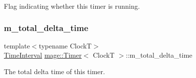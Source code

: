 Flag indicating whether this timer is running. \mbox{\label{classmage_1_1_timer_aa62b280ee2b58a3f75440cc4faf10b23}} 
\subsubsection{\texorpdfstring{m\+\_\+total\+\_\+delta\+\_\+time}{m\_total\_delta\_time}}
{\footnotesize\ttfamily template$<$typename ClockT$>$ \\
\mbox{\hyperlink{classmage_1_1_timer_a5c0fd78ceab0110637622bd0e9b8424d}{Time\+Interval}} \mbox{\hyperlink{classmage_1_1_timer}{mage\+::\+Timer}}$<$ ClockT $>$\+::m\+\_\+total\+\_\+delta\+\_\+time\hspace{0.3cm}{\ttfamily [private]}}

The total delta time of this timer. 